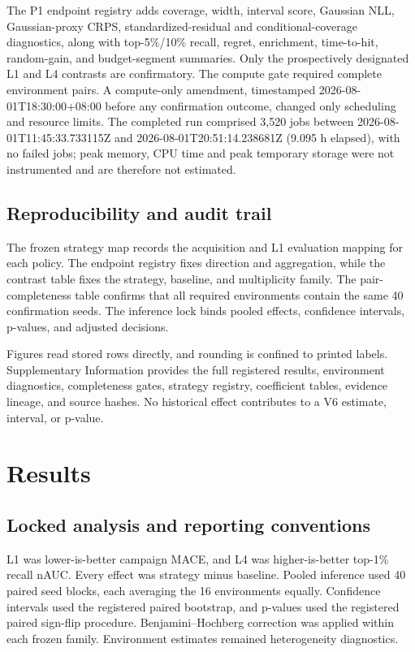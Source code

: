 \documentclass[10pt,twocolumn]{article}
\begin{document}
The P1 endpoint registry adds coverage, width, interval score, Gaussian NLL,
Gaussian-proxy CRPS, standardized-residual and conditional-coverage
diagnostics, along with top-5\%/10\% recall, regret, enrichment, time-to-hit,
random-gain, and budget-segment summaries. Only the prospectively designated
L1 and L4 contrasts are confirmatory. The compute gate required complete environment pairs. A compute-only amendment, timestamped 2026-08-01T18:30:00+08:00 before any confirmation outcome, changed only scheduling and resource limits. The completed run comprised 3,520 jobs between 2026-08-01T11:45:33.733115Z and 2026-08-01T20:51:14.238681Z (9.095 h elapsed), with no failed jobs; peak memory, CPU time and peak temporary storage were not instrumented and are therefore not estimated.

\subsection{Reproducibility and audit trail}
The frozen strategy map records the acquisition and L1 evaluation mapping for
each policy. The endpoint registry fixes direction and aggregation, while the
contrast table fixes the strategy, baseline, and multiplicity family. The
pair-completeness table confirms that all required environments contain the
same 40 confirmation seeds. The inference lock binds pooled effects,
confidence intervals, p-values, and adjusted decisions.

Figures read stored rows directly, and rounding is confined to printed
labels. Supplementary Information provides the full registered results,
environment diagnostics, completeness gates, strategy registry, coefficient
tables, evidence lineage, and source hashes. No historical effect contributes
to a V6 estimate, interval, or p-value.

\section{Results}
\subsection{Locked analysis and reporting conventions}
L1 was lower-is-better campaign MACE, and L4 was higher-is-better top-1\%
recall nAUC. Every effect was strategy minus baseline. Pooled inference used
40 paired seed blocks, each averaging the 16 environments equally.
Confidence intervals used the registered paired bootstrap, and p-values used
the registered paired sign-flip procedure. Benjamini--Hochberg correction was
applied within each frozen family. Environment estimates remained
heterogeneity diagnostics.
\end{document}
